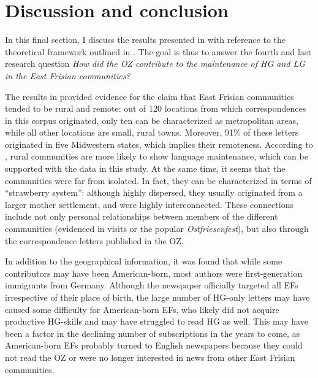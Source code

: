 \documentclass[output=paper]{langsci/langscibook}
\begin{document}
\section{Discussion and conclusion} %
\label{sec:rocker:5}
 
In this final section, I discuss the results presented in  with reference to the theoretical framework outlined in . The goal is thus to answer the fourth and last research question \textit{How did the OZ contribute to the maintenance of HG and LG in the East Frisian communities?}
 

 
The results in  provided evidence for the claim that East Frisian communities tended to be rural and remote: out of 120 locations from which correspondences in this corpus originated, only ten can be characterized as metropolitan areas, while all other locations are small, rural towns. Moreover, 91\% of these letters originated in five Midwestern states, which implies their remoteness. According to \citet{Louden2006}, rural communities are more likely to show language maintenance, which can be supported with the data in this study. At the same time, it seems that the communities were far from isolated. In fact, they can be characterized in terms of  “strawberry system”: although highly dispersed, they usually originated from a larger mother settlement, and were highly interconnected. These connections include not only personal relationships between members of the different communities (evidenced in visits or the popular \textit{Ostfriesenfest}), but also through the correspondence letters published in the OZ. 
 

 
In addition to the geographical information, it was found that while some contributors may have been American-born, most authors were first-generation immigrants from Germany. Although the newspaper officially targeted all EFs irrespective of their place of birth, the large number of HG-only letters may have caused some difficulty for American-born EFs, who likely did not acquire productive HG-skills and may have struggled to read HG as well. This may have been a factor in the declining number of subscriptions in the years to come, as American-born EFs probably turned to English newspapers because they could not read the OZ or were no longer interested in news from other East Frisian communities.
 
\end{document}
